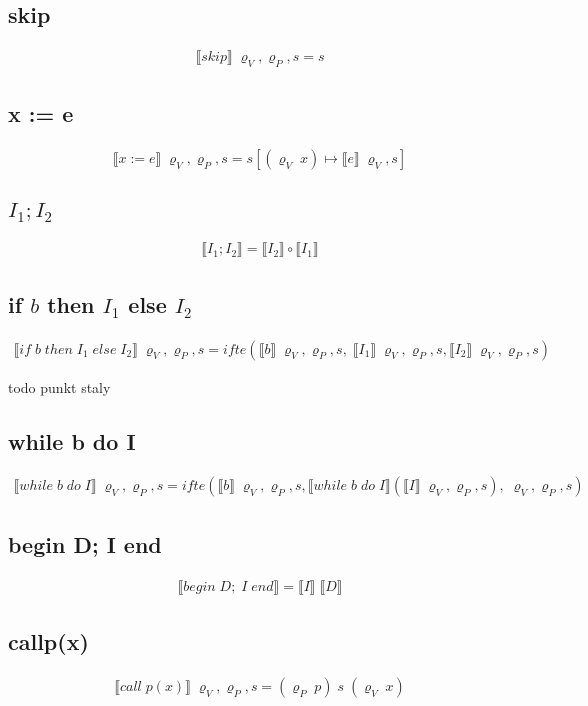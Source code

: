 \documentclass[12pt]{article}
\newcommand{\sem}[1]{\llbracket #1 \rrbracket}
\newcommand{\srod}{\;\varrho_{V}, s}
\newcommand{\srodP}{\;\varrho_{V}, \varrho_{P}, s}
\newcommand{\eq}[2]{\subsection*{#1} \begin{gather*} #2 \end{gather*}}
\begin{document}
\eq {skip} {
	\sem{skip} \srodP = s
}

\eq {x := e} {
	\sem{x := e} \srodP = s[(\varrho_V \; x) \mapsto \sem{e} \srod]
}

\eq {$I_1;I_2$} {
	\sem{I_1;I_2} = \sem{I_2} \circ \sem{I_1}
}

\eq {if $b$ then $I_1$ else $I_2$} {
	\sem{if\;b\;then\;I_1\;else\;I_2} \srodP = ifte(\sem{b}\srodP,\;\sem{I_1}\srodP, \sem{I_2}\srodP )
}


todo punkt staly
\eq {while b do I} {
	\sem{while\;b\;do\;I} \srodP = ifte(\sem{b}\srodP, \sem{while\;b\;do\;I} (\sem{I} \srodP),\srodP)
}

\eq {begin D; I end} {
	\sem{begin\;D;\;I\;end} = \sem{I} \; \sem{D}
}

\eq {call\;p(x)} {
	\sem{call\;p(x)} \srodP = (\varrho_P \; p) \; s \; (\varrho_V \; x)
}
\end{document}
